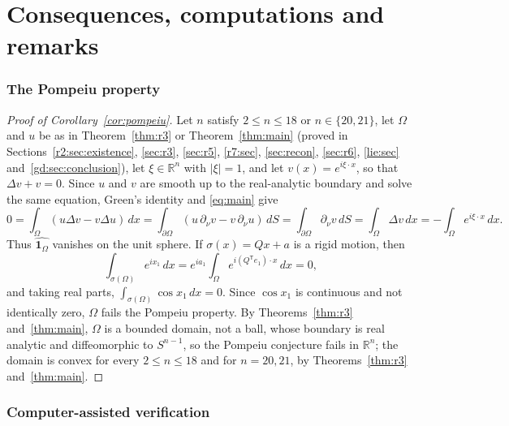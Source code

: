 \documentclass[11pt]{amsart}
\newcommand{\topdim}{18}
\theoremstyle{definition}
\theoremstyle{remark}
\numberwithin{equation}{section}
\newcommand{\R}{\mathbb{R}}
\newcommand{\one}{\mathbf{1}}
\begin{document}



\part{Consequences, computations and remarks}\label{part:further}

\section{The Pompeiu property}\label{sec:pompeiu}

\begin{proof}[Proof of Corollary~\ref{cor:pompeiu}]
Let $n$ satisfy $2\le n\le\topdim$ or $n\in\{20,21\}$, let $\Omega$ and $u$ be as in Theorem~\ref{thm:r3} or Theorem~\ref{thm:main} (proved in Sections~\ref{r2:sec:existence}, \ref{sec:r3}, \ref{sec:r5}, \ref{r7:sec}, \ref{sec:recon}, \ref{sec:r6}, \ref{lie:sec} and~\ref{gd:sec:conclusion}), let $\xi\in\R^n$ with $|\xi|=1$, and let $v(x)=e^{i\xi\cdot x}$, so that $\Delta v+v=0$. Since $u$ and $v$ are smooth up to the real-analytic boundary and solve the same equation, Green's identity and \eqref{eq:main} give
\[
0=\int_\Omega(u\Delta v-v\Delta u)\,dx=\int_{\partial\Omega}(u\,\partial_\nu v-v\,\partial_\nu u)\,dS=\int_{\partial\Omega}\partial_\nu v\,dS=\int_\Omega\Delta v\,dx=-\int_\Omega e^{i\xi\cdot x}\,dx .
\]
Thus $\widehat{\one_\Omega}$ vanishes on the unit sphere. If $\sigma(x)=Qx+a$ is a rigid motion, then
\[
\int_{\sigma(\Omega)}e^{ix_1}\,dx=e^{ia_1}\int_\Omega e^{i(Q^{\mathsf T}e_1)\cdot x}\,dx=0,
\]
and taking real parts, $\int_{\sigma(\Omega)}\cos x_1\,dx=0$. Since $\cos x_1$ is continuous and not identically zero, $\Omega$ fails the Pompeiu property. By Theorems~\ref{thm:r3} and~\ref{thm:main}, $\Omega$ is a bounded domain, not a ball, whose boundary is real analytic and diffeomorphic to $S^{n-1}$, so the Pompeiu conjecture fails in $\R^n$; the domain is convex for every $2\le n\le\topdim$ and for $n=20,21$, by Theorems~\ref{thm:r3} and~\ref{thm:main}.
\end{proof}

\section{Computer-assisted verification}\label{sec:cap}
\end{document}
